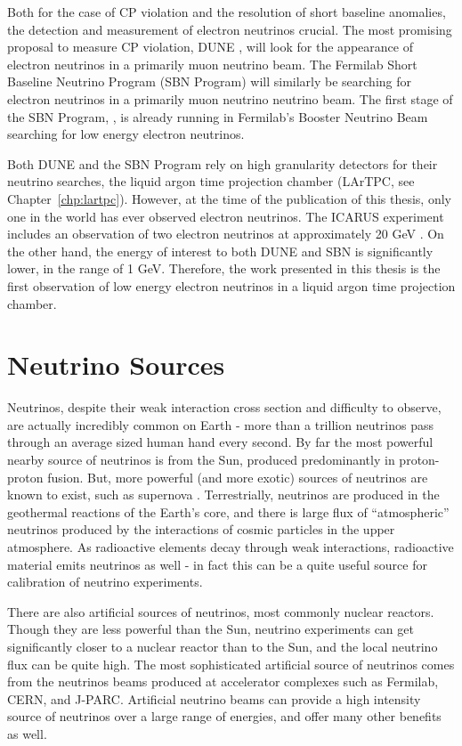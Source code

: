 Both for the case of CP violation and the resolution of short baseline anomalies, the detection and measurement of electron neutrinos crucial.  The most promising proposal to measure CP violation, DUNE \cite{DUNE}, will look for the appearance of electron neutrinos in a primarily muon neutrino beam.  The Fermilab Short Baseline Neutrino Program (SBN Program) \cite{SBN} will similarly be searching for electron neutrinos in a primarily muon neutrino neutrino beam.  The first stage of the SBN Program, \uboone, is already running in Fermilab's Booster Neutrino Beam searching for low energy electron neutrinos.

Both DUNE and the SBN Program rely on high granularity detectors for their neutrino searches, the liquid argon time projection chamber (LArTPC, see Chapter~\ref{chp:lartpc}).  However, at the time of the publication of this thesis, only one \lartpc in the world has ever observed electron neutrinos.  The ICARUS experiment includes an observation of two electron neutrinos at approximately 20 GeV \cite{ICARUS_steriles}.  On the other hand, the energy of interest to both DUNE and SBN is significantly lower, in the range of 1 GeV.  Therefore, the work presented in this thesis is the first observation of low energy electron neutrinos in a liquid argon time projection chamber.   

\section{Neutrino Sources}

Neutrinos, despite their weak interaction cross section and difficulty to observe, are actually incredibly common on Earth - more than a trillion neutrinos pass through an average sized human hand every second.  By far the most powerful nearby source of neutrinos is from the Sun, produced predominantly in proton-proton fusion.  But, more powerful (and more exotic) sources of neutrinos are known to exist, such as supernova \cite{supernova_1987a}.  Terrestrially, neutrinos are produced in the geothermal reactions of the Earth's core, and there is large flux of ``atmospheric'' neutrinos produced by the interactions of cosmic particles in the upper atmosphere.  As radioactive elements decay through weak interactions, radioactive material emits neutrinos as well - in fact this can be a quite useful source for calibration of neutrino experiments.

There are also artificial sources of neutrinos, most commonly nuclear reactors.  Though they are less powerful than the Sun, neutrino experiments can get significantly closer to a nuclear reactor than to the Sun, and the local neutrino flux can be quite high.  The most sophisticated artificial source of neutrinos comes from the neutrinos beams produced at accelerator complexes such as Fermilab, CERN, and J-PARC.  Artificial neutrino beams can provide a high intensity source of neutrinos over a large range of energies, and offer many other benefits as well.  

